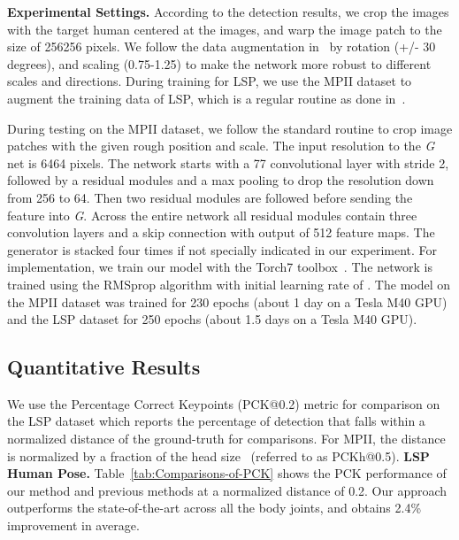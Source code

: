 \documentclass[10pt,letterpaper,twocolumn]{article}
\begin{document}
\noindent \textbf{Experimental Settings.} According to the detection results, we crop the images with the target human centered at the
images, and warp the image patch to the size of 256256 pixels. We follow the data augmentation in~\cite{conf/eccv/NewellYD16} by rotation (+/- 30 degrees), and scaling (0.75-1.25) to make the network more robust to different scales and directions. During training for LSP, we use the MPII dataset to augment the training data of LSP, which is a regular routine as done in~\cite{conf/cvpr/WeiRKS16,conf/eccv/InsafutdinovPAA16}.

During testing on the MPII dataset, we follow the standard routine to crop image patches with the given rough position and scale.
The input resolution to the \textit{G} net is 6464 pixels. The network starts with a 77 convolutional layer with stride 2, followed by a residual modules and a max pooling to drop the resolution down from 256 to 64. Then two residual modules are followed before sending the feature into \textit{G}. Across the entire network all residual modules contain three convolution layers and a skip connection with output of 512 feature maps. The generator is stacked four times if not specially indicated in our experiment. For implementation, we train our model with the Torch7 toolbox~\cite{conf/nips/torch7}. The network is trained using the RMSprop algorithm with initial learning rate of . The model on the MPII dataset was trained for 230 epochs (about 1 day on a Tesla M40 GPU) and the LSP dataset for 250 epochs (about 1.5 days on a Tesla M40 GPU).

\subsection{Quantitative Results}\label{subsec:Results}

We use the Percentage Correct Keypoints (PCK@0.2) \cite{yang2013articulated} metric for comparison on the LSP dataset which reports the percentage of detection that falls within a normalized distance of the ground-truth for comparisons. For MPII, the distance is normalized by a fraction of the head size~\cite{conf/cvpr/AndrilukaPGS14} (referred to as PCKh@0.5). 
\noindent \textbf{LSP Human Pose.} Table~\ref{tab:Comparisons-of-PCK} shows the PCK performance of our method and previous methods at a normalized distance of 0.2. Our approach outperforms the state-of-the-art across all the body joints, and obtains 2.4\% improvement in average.
\end{document}
